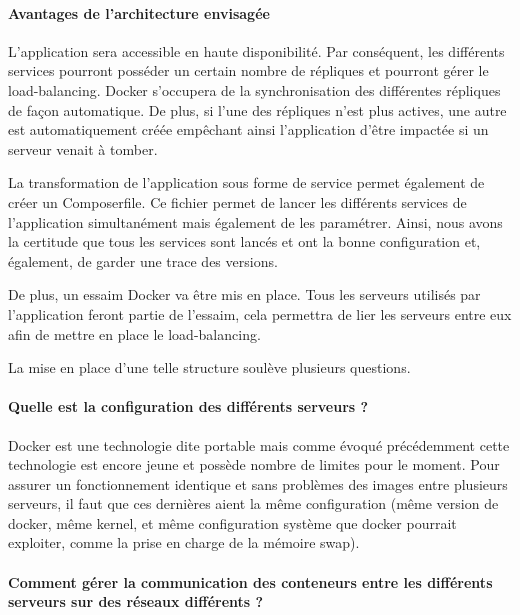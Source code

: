 \paragraph{Avantages de l'architecture envisagée}

\par L’application sera accessible en haute disponibilité. Par conséquent, les différents services pourront posséder un certain nombre de répliques et pourront gérer le load-balancing. Docker s'occupera de la synchronisation des différentes répliques de façon automatique. De plus, si l’une des répliques n’est plus actives, une autre est automatiquement créée empêchant ainsi l'application d'être impactée si un serveur venait à tomber. 

\par La transformation de l’application sous forme de service permet également de créer un Composerfile. Ce fichier permet de lancer les différents services de l’application simultanément mais également de les paramétrer. Ainsi, nous avons la certitude que tous les services sont lancés et ont la bonne configuration et, également, de garder une trace des versions.

\par De plus, un essaim Docker va être mis en place. Tous les serveurs utilisés par l’application feront partie de l’essaim, cela permettra de lier les serveurs entre eux afin de mettre en place le load-balancing.

\par La mise en place d’une telle structure soulève plusieurs questions.

\paragraph{Quelle est la configuration des différents serveurs ?} 

\par Docker est une technologie dite portable mais comme évoqué précédemment cette technologie est encore jeune et possède nombre de limites pour le moment. Pour assurer un fonctionnement identique et sans problèmes des images entre plusieurs serveurs, il faut que ces dernières aient la même configuration (même version de docker, même kernel, et même configuration système que docker pourrait exploiter, comme la prise en charge de la mémoire swap). 

\paragraph{Comment gérer la communication des conteneurs entre les différents serveurs sur des réseaux différents ?} 

